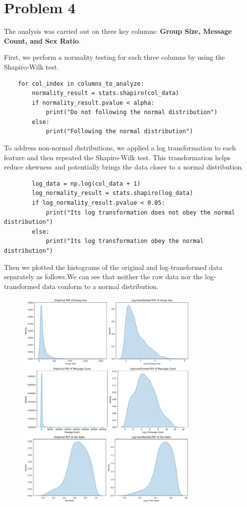 \documentclass[12pt]{article}
\begin{document}
\newpage
\section*{Problem 4}
The analysis was carried out on three key columns: \textbf{Group Size, Message Count, and Sex Ratio}.

First, we perform a normality testing for each three columns by using the Shapiro-Wilk test. 
\begin{verbatim}
    for col_index in columns_to_analyze:
        normality_result = stats.shapiro(col_data)
        if normality_result.pvalue < alpha:
            print("Do not following the normal distribution")
        else:
            print("Following the normal distribution")
\end{verbatim}

To address non-normal distributions, we applied a log transformation to each feature and then repeated the Shapiro-Wilk test. This transformation helps reduce skewness and potentially brings the data closer to a normal distribution.
\begin{verbatim}
        log_data = np.log(col_data + 1)  
        log_normality_result = stats.shapiro(log_data)
        if log_normality_result.pvalue < 0.05:
            print("Its log transformation does not obey the normal distribution")
        else:
            print("Its log transformation obey the normal distribution")
\end{verbatim}

Then we plotted the histograms of the original and log-transformed data separately as follows.We can see that neither the raw data nor the log-transformed data conform to a normal distribution.

\begin{figure}[h]
    \centering
    \includegraphics[width=0.8\textwidth]{image/output3.png}  
    \label{fig:PDF of Original and Log-transformed Data}
\end{figure}
\newpage
\end{document}
